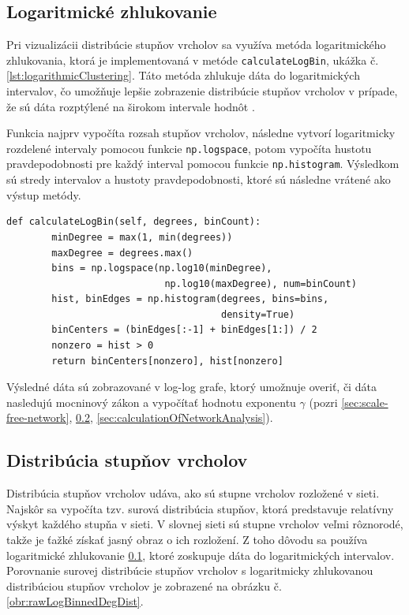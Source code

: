 \subsection{Logaritmické zhlukovanie}\label{sec:logarithmicClustering}

Pri vizualizácii distribúcie stupňov vrcholov sa využíva metóda logaritmického zhlukovania, ktorá je implementovaná
v metóde \texttt{calculateLogBin}, ukážka č. \ref{lst:logarithmicClustering}. Táto metóda zhlukuje dáta do logaritmických intervalov,
čo umožňuje lepšie zobrazenie distribúcie stupňov vrcholov v prípade, že sú dáta rozptýlené na širokom intervale hodnôt \cite{Milojevi__2010}.

Funkcia najprv vypočíta rozsah stupňov vrcholov, následne vytvorí logaritmicky rozdelené intervaly pomocou funkcie \texttt{np.logspace},
potom vypočíta hustotu pravdepodobnosti pre každý interval pomocou funkcie \texttt{np.histogram}. Výsledkom sú stredy intervalov a
hustoty pravdepodobnosti, ktoré sú následne vrátené ako výstup metódy.

\begin{lstlisting}[caption={Metóda pre výpočet logaritmického zhlukovania.}, label={lst:logarithmicClustering}]
    def calculateLogBin(self, degrees, binCount):
        minDegree = max(1, min(degrees))
        maxDegree = degrees.max()
        bins = np.logspace(np.log10(minDegree), 
                            np.log10(maxDegree), num=binCount)
        hist, binEdges = np.histogram(degrees, bins=bins, 
                                      density=True)
        binCenters = (binEdges[:-1] + binEdges[1:]) / 2
        nonzero = hist > 0
        return binCenters[nonzero], hist[nonzero]
\end{lstlisting}

Výsledné dáta sú zobrazované v log-log grafe, ktorý umožnuje overiť, či dáta nasledujú mocninový zákon a vypočítať hodnotu exponentu
$\gamma$ (pozri \ref{sec:scale-free-network}, \ref{sec:degreeDistribution}, \ref{sec:calculationOfNetworkAnalysis}).

\subsection{Distribúcia stupňov vrcholov}\label{sec:degreeDistribution}

Distribúcia stupňov vrcholov udáva, ako sú stupne vrcholov rozložené v sieti. Najskôr sa vypočíta tzv. surová distribúcia stupňov,
ktorá predstavuje relatívny výskyt každého stupňa v sieti. V slovnej sieti sú stupne vrcholov veľmi rôznorodé, takže je ťažké získať
jasný obraz o ich rozložení. Z toho dôvodu sa používa logaritmické zhlukovanie \ref{sec:logarithmicClustering},
ktoré zoskupuje dáta do logaritmických intervalov. Porovnanie surovej distribúcie stupňov vrcholov s logaritmicky zhlukovanou distribúciou stupňov
vrcholov je zobrazené na obrázku č. \ref{obr:rawLogBinnedDegDist}.

